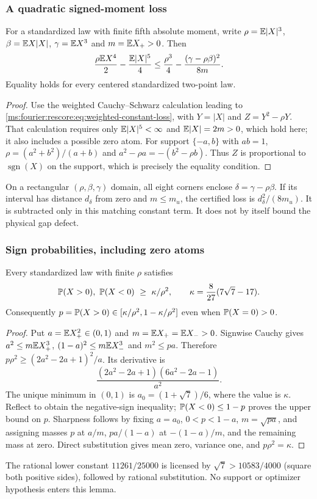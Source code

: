 \subsubsection{A quadratic signed-moment loss}
\begin{lemma}\label{ms:finite:signed-loss}
For a standardized law with finite fifth absolute moment, write
$\rho=\mathbb E|X|^3$, $\beta=\mathbb E X|X|$, $\gamma=\mathbb E X^3$ and
$m=\mathbb E X_+>0$. Then
\[
 \frac{\rho\mathbb E X^4}{2}-\frac{\mathbb E|X|^5}{4}
 \le\frac{\rho^3}{4}-\frac{(\gamma-\rho\beta)^2}{8m}.
\]
Equality holds for every centered standardized two-point law.
\end{lemma}
\begin{proof}
Use the weighted Cauchy--Schwarz calculation leading to
\eqref{ms:fourier:rescore:eq:weighted-constant-loss}, with
$Y=|X|$ and $Z=Y^2-\rho Y$. That calculation requires only
$\mathbb E|X|^5<\infty$ and $\mathbb E|X|=2m>0$, which hold here; it also
includes a possible zero atom.
For support $\{-a,b\}$ with $ab=1$,
$\rho=(a^2+b^2)/(a+b)$ and $a^2-\rho a=-(b^2-\rho b)$.
Thus $Z$ is proportional to $\operatorname{sgn}(X)$ on the support,
which is precisely the equality condition.
\end{proof}
On a rectangular $(\rho,\beta,\gamma)$ domain, all eight corners
enclose $\delta=\gamma-\rho\beta$. If its interval has distance
$d_\delta$ from zero and $m\le m_u$, the certified loss is
$d_\delta^2/(8m_u)$. It is subtracted only in this matching constant
term. It does not by itself bound the physical gap defect.

\subsubsection{Sign probabilities, including zero atoms}
\begin{lemma}\label{ms:finite:sign-probability}
Every standardized law with finite $\rho$ satisfies
\[
 \Pp(X>0),\ \Pp(X<0)\ \ge\ \kappa/\rho^2,
 \qquad \kappa=\frac8{27}(7\sqrt7-17).
\]
Consequently $p=\mathbb P(X>0)\in[\kappa/\rho^2,1-\kappa/\rho^2]$
even when $\mathbb P(X=0)>0$.
\end{lemma}
\begin{proof}
Put $a=\mathbb E X_+^2\in(0,1)$ and $m=\mathbb E X_+=\mathbb E X_->0$.
Signwise Cauchy gives
$a^2\le m\mathbb E X_+^3$, $(1-a)^2\le m\mathbb E X_-^3$ and $m^2\le pa$.
Therefore $p\rho^2\ge(2a^2-2a+1)^2/a$. Its derivative is
\[
 \frac{(2a^2-2a+1)(6a^2-2a-1)}{a^2}.
\]
The unique minimum in $(0,1)$ is $a_0=(1+\sqrt7)/6$, where the
value is $\kappa$. Reflect to obtain the negative-sign inequality;
$\mathbb P(X<0)\le1-p$ proves the upper bound on $p$.
Sharpness follows by fixing $a=a_0$, $0<p<1-a$, $m=\sqrt{pa}$,
and assigning masses $p$ at $a/m$, $pa/(1-a)$ at $-(1-a)/m$,
and the remaining mass at zero. Direct substitution gives mean zero,
variance one, and $p\rho^2=\kappa$.
\end{proof}
The rational lower constant $11261/25000$ is licensed by
$\sqrt7>10583/4000$ (square both positive sides), followed by
rational substitution. No support or optimizer hypothesis enters this lemma.

